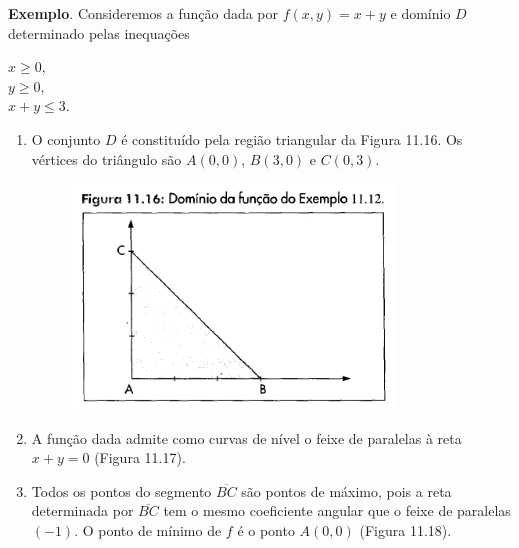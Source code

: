 		\textbf{Exemplo}. Consideremos a função dada por $f(x, y) = x + y$ e domínio $D$ determinado pelas inequações

		\medskip

		$x \geq 0$, \\
		$y \geq 0$, \\
		$x + y \leq 3$.

		\medskip

		\begin{enumerate}[label=\alph*)]

			\item O conjunto $D$ é constituído pela região triangular da Figura 11.16. Os vértices do triângulo são $A(0, 0)$, $B(3, 0)$ e $C(0, 3)$.

			\begin{figure}[H]
				\includegraphics[height=6cm]{images/morettin_figura-11-16}
			\end{figure}

			\item A função dada admite como curvas de nível o feixe de paralelas à reta $x + y = 0$ (Figura 11.17).

			\item Todos os pontos do segmento $\overline{BC}$ são pontos de máximo, pois a reta determinada por $\overline{BC}$ tem o mesmo coeficiente angular que o feixe de paralelas $(-1)$. O ponto de mínimo de $f$ é o ponto $A(0, 0)$ (Figura 11.18).


\end{enumerate}
